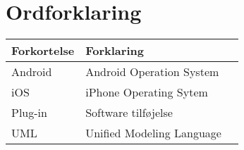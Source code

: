 \chapter*{Ordforklaring}

\begin{tabularx}{\textwidth}{l l X} \hline
	\textbf{Forkortelse}  & \textbf{Forklaring} \\ \hline
	Android& Android Operation System& \\
	iOS&  iPhone Operating Sytem& \\
	Plug-in&  Software tilføjelse& \\
	UML& Unified Modeling Language& \\
	
\end{tabularx}